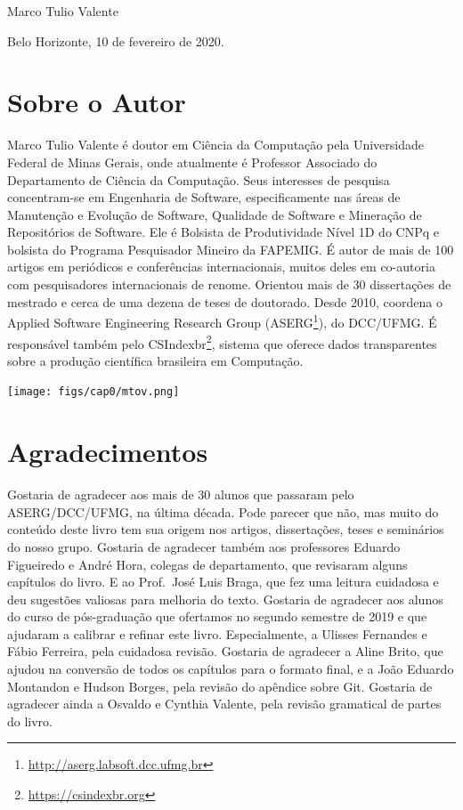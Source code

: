 \documentclass[
  11pt,
  twoside]{book}
\DeclareRobustCommand{\href}[2]{#2\footnote{\url{#1}}}
\begin{document}
\vspace{0.8cm}

Marco Tulio Valente

Belo Horizonte, 10 de fevereiro de 2020.

\newpage

\hypertarget{sobre-o-autor}{%
\section*{Sobre o Autor}\label{sobre-o-autor}}

Marco Tulio Valente é doutor em Ciência da Computação pela Universidade
Federal de Minas Gerais, onde atualmente é Professor Associado do
Departamento de Ciência da Computação. Seus interesses de pesquisa
concentram-se em Engenharia de Software, especificamente nas áreas de
Manutenção e Evolução de Software, Qualidade de Software e Mineração de
Repositórios de Software. Ele é Bolsista de Produtividade Nível 1D do
CNPq e bolsista do Programa Pesquisador Mineiro da FAPEMIG. É autor de
mais de 100 artigos em periódicos e conferências internacionais, muitos
deles em co-autoria com pesquisadores internacionais de renome. Orientou
mais de 30 dissertações de mestrado e cerca de uma dezena de teses de
doutorado. Desde 2010, coordena o Applied Software Engineering Research
Group (\href{http://aserg.labsoft.dcc.ufmg.br}{ASERG}), do DCC/UFMG. É
responsável também pelo \href{https://csindexbr.org}{CSIndexbr}, sistema
que oferece dados transparentes sobre a produção científica brasileira
em Computação.

\texttt{[image: figs/cap0/mtov.png]}

\newpage

\hypertarget{agradecimentos}{%
\section*{Agradecimentos}\label{agradecimentos}}

Gostaria de agradecer aos mais de 30 alunos que passaram pelo
ASERG/DCC/UFMG, na última década. Pode parecer que não, mas muito do
conteúdo deste livro tem sua origem nos artigos, dissertações, teses e
seminários do nosso grupo. Gostaria de agradecer também aos professores
Eduardo Figueiredo e André Hora, colegas de departamento, que revisaram
alguns capítulos do livro. E ao Prof.~José Luis Braga, que fez uma
leitura cuidadosa e deu sugestões valiosas para melhoria do texto.
Gostaria de agradecer aos alunos do curso de pós-graduação que ofertamos
no segundo semestre de 2019 e que ajudaram a calibrar e refinar este
livro. Especialmente, a Ulisses Fernandes e Fábio Ferreira, pela
cuidadosa revisão. Gostaria de agradecer a Aline Brito, que ajudou na
conversão de todos os capítulos para o formato final, e a João Eduardo
Montandon e Hudson Borges, pela revisão do apêndice sobre Git. Gostaria
de agradecer ainda a Osvaldo e Cynthia Valente, pela revisão gramatical
de partes do livro.
\end{document}
